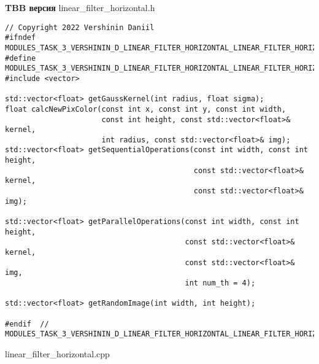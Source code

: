 \documentclass{report}
\begin{document}
\textbf{TBB версия}
\newline
\newline linear\_filter\_horizontal.h
\begin{lstlisting}
// Copyright 2022 Vershinin Daniil
#ifndef MODULES_TASK_3_VERSHININ_D_LINEAR_FILTER_HORIZONTAL_LINEAR_FILTER_HORIZONTAL_H_
#define MODULES_TASK_3_VERSHININ_D_LINEAR_FILTER_HORIZONTAL_LINEAR_FILTER_HORIZONTAL_H_
#include <vector>

std::vector<float> getGaussKernel(int radius, float sigma);
float calcNewPixColor(const int x, const int y, const int width,
                      const int height, const std::vector<float>& kernel,
                      int radius, const std::vector<float>& img);
std::vector<float> getSequentialOperations(const int width, const int height,
                                           const std::vector<float>& kernel,
                                           const std::vector<float>& img);

std::vector<float> getParallelOperations(const int width, const int height,
                                         const std::vector<float>& kernel,
                                         const std::vector<float>& img,
                                         int num_th = 4);

std::vector<float> getRandomImage(int width, int height);

#endif  // MODULES_TASK_3_VERSHININ_D_LINEAR_FILTER_HORIZONTAL_LINEAR_FILTER_HORIZONTAL_H_
\end{lstlisting}
linear\_filter\_horizontal.cpp
\end{document}

